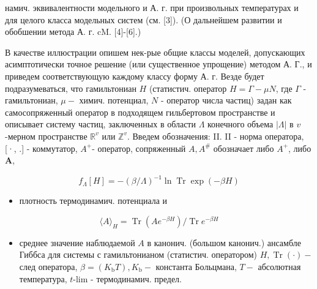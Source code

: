 \documentclass[10pt]{article}
\begin{document}
намич. эквивалентности модельного и А. г. при произвольных температурах и для целого класса модельных систем (см. [3]). (О дальнейшем развитии и обобшении метода А. г. cM. [4]-[6].)



В качестве иллюстрации опишем нек-рые общие классы моделей, допускающих асимптотически точное решение (или существенное упрощение) методом А. Г., и приведем соответствующую каждому классу форму А. г. Везде будет подразумеваться, что гамильтониан $H$ (статистич. оператор $H=\Gamma-\mu N$, где $\Gamma$ - гамильтониан, $\mu-$ химич. потенциал, $N$ - оператор числа частиц) задан как самосопряженный оператор в подходящем гильбертовом пространстве и описывает систему частиц, заключенных в области $\Lambda$ конечного объема $|\Lambda|$ в $v$-мерном пространстве $\mathbb{R}^{v}$ или $\mathbb{Z}^{v}$. Введем обозначения: II. II - норма оператора, [·, .] - коммутатор, $A^{+}$- оператор, сопряженный $A, A^{\#}$ обозначает либо $A^{+}$, либо $\boldsymbol{A}$,



\[

f_{\Lambda}[H]=-(\beta / \Lambda)^{-1} \ln \operatorname{Tr} \exp (-\beta H)

\]



\begin{itemize}

  \item плотность термодинамич. потенциала и

\end{itemize}



\[

\langle A\rangle_{H}=\operatorname{Tr}\left(A e^{-\beta H}\right) / \operatorname{Tr} e^{-\beta H}

\]



\begin{itemize}

  \item среднее значение наблюдаемой $A$ в канонич. (большом канонич.) ансамбле Гиббса для системы с гамильтонианом (статистич. оператором) $H, \operatorname{Tr}(\cdot)-$ след оператора, $\beta=\left(K_{\mathrm{b}} T\right), K_{\mathrm{b}}-$ константа Больцмана, $T-$ абсолютная температура, $t$-lim - термодинамич. предел.

\end{itemize}
\end{document}
